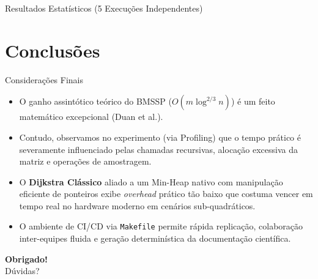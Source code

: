 \documentclass[aspectratio=169, 11pt]{beamer}
\begin{document}
\begin{frame}{Resultados Estatísticos (5 Execuções Independentes)}
    
\end{frame}

\section{Conclusões}
\begin{frame}{Considerações Finais}
    \begin{itemize}
        \item O ganho assintótico teórico do BMSSP ($O(m \log^{2/3} n)$) é um feito matemático excepcional (Duan et al.).
        \item Contudo, observamos no experimento (via Profiling) que o tempo prático é severamente influenciado pelas chamadas recursivas, alocação excessiva da matriz e operações de amostragem.
        \item O \textbf{Dijkstra Clássico} aliado a um Min-Heap nativo com manipulação eficiente de ponteiros exibe \textit{overhead} prático tão baixo que costuma vencer em tempo real no hardware moderno em cenários sub-quadráticos.
        \item O ambiente de CI/CD via \texttt{Makefile} permite rápida replicação, colaboração inter-equipes fluida e geração determinística da documentação científica.
    \end{itemize}
\end{frame}

\begin{frame}
    \centering
    \Huge \textbf{Obrigado!} \\
    \vspace{1cm}
    \Large Dúvidas?
\end{frame}
\end{document}
